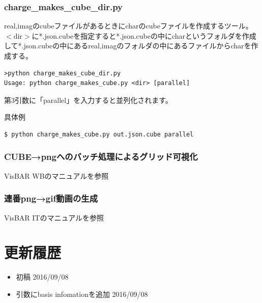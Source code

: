 \documentclass{jsarticle}
\begin{document}
\subsubsection{charge\_makes\_cube\_dir.py}
real,imagのcubeファイルがあるときにcharのcubeファイルを作成するツール。\\
$<$dir$>$に*.json.cubeを指定すると*.json.cubeの中にcharというフォルダを作成して*.json.cubeの中にあるreal,imagのフォルダの中にあるファイルからcharを作成する。
\begin{Verbatim}[frame=single]
>python charge_makes_cube_dir.py
Usage: python charge_makes_cube.py <dir> [parallel]
\end{Verbatim}
第3引数に「parallel」を入力すると並列化されます。

具体例\\
\begin{Verbatim}[frame=single]
$ python charge_makes_cube.py out.json.cube parallel
\end{Verbatim}

\subsubsection{CUBE→pngへのバッチ処理によるグリッド可視化}
VisBAR WBのマニュアルを参照

\subsubsection{連番png→gif動画の生成}
VisBAR ITのマニュアルを参照


\newpage
\appendix
\section{更新履歴}
\begin{itemize}
\item 初稿 2016/09/08
\item 引数にbasis infomationを追加 2016/09/08

\end{itemize}
\end{document}
